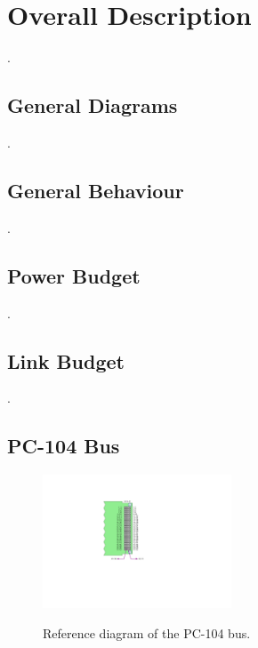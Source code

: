 %
%
%
%
%

%
%
%
%
%
%

\chapter{Overall Description} \label{ch:overall}

.

\section{General Diagrams}

.

\section{General Behaviour}

.

\section{Power Budget}

.

\section{Link Budget}

.

\section{PC-104 Bus}

\begin{figure}[!ht]
    \begin{center}
        \includegraphics[width=0.5\textwidth]{figures/pc104-diagram}
        \label{fig:pc104-diagram}
        \caption{Reference diagram of the PC-104 bus.}
    \end{center}
\end{figure}

